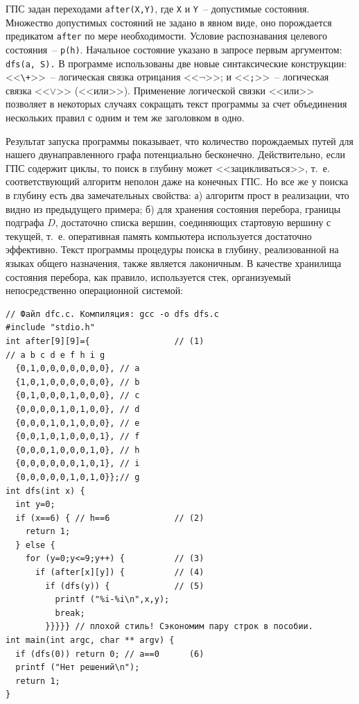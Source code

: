 \documentclass[a4paper,14pt, openany, twoside, final]{extbook} %
\begin{document}
ГПС задан переходами \texttt{after(X,Y)}, где \texttt{X} и \texttt{Y}~-- допустимые состояния.  Множество допустимых состояний не задано в явном виде, оно порождается предикатом \texttt{after} по мере необходимости.  Условие распознавания целевого состояния~-- \texttt{p(h)}.  Начальное состояние указано в запросе первым аргументом: \texttt{dfs(a, S).}  В программе использованы две новые синтаксические конструкции: <<\texttt{\backslash +}>>~--  логическая связка отрицания <<$\neg$>>; и <<\texttt{;}>>~-- логическая связка <<$\vee$>> (<<или>>).  Применение  логической связки <<или>> позволяет в некоторых случаях сокращать текст программы за счет объединения нескольких правил с одним и тем же заголовком в одно.

Результат запуска программы показывает, что количество порождаемых путей для нашего двунаправленного графа потенциально бесконечно.  Действительно, если ГПС содержит циклы, то поиск в глубину может <<зацикливаться>>, т.~е. соответствующий алгоритм неполон даже на конечных ГПС.  Но все же у поиска в глубину есть два замечательных свойства: а) алгоритм прост в реализации, что видно из предыдущего примера; б) для хранения состояния перебора, границы подграфа $D$, достаточно списка вершин, соединяющих стартовую вершину с текущей, т.~е. оперативная память компьютера используется достаточно эффективно.  Текст программы процедуры поиска в глубину, реализованной на языках общего назначения, также является лаконичным.  В качестве хранилища состояния перебора, как правило, используется стек, организуемый непосредственно операционной системой:

\begin{verbatim}
// Файл dfc.c. Компиляция: gcc -o dfs dfs.c
#include "stdio.h"
int after[9][9]={                 // (1)
// a b c d e f h i g
  {0,1,0,0,0,0,0,0,0}, // a
  {1,0,1,0,0,0,0,0,0}, // b
  {0,1,0,0,0,1,0,0,0}, // c
  {0,0,0,0,1,0,1,0,0}, // d
  {0,0,0,1,0,1,0,0,0}, // e
  {0,0,1,0,1,0,0,0,1}, // f
  {0,0,0,1,0,0,0,1,0}, // h
  {0,0,0,0,0,0,1,0,1}, // i
  {0,0,0,0,0,1,0,1,0}};// g
int dfs(int x) {
  int y=0;
  if (x==6) { // h==6             // (2)
    return 1;
  } else {
    for (y=0;y<=9;y++) {          // (3)
      if (after[x][y]) {          // (4)
        if (dfs(y)) {             // (5)
          printf ("%i-%i\n",x,y);
          break;
        }}}}} // плохой стиль! Сэкономим пару строк в пособии.
int main(int argc, char ** argv) {
  if (dfs(0)) return 0; // a==0      (6)
  printf ("Нет решений\n");
  return 1;
}
\end{verbatim}
\end{document}
